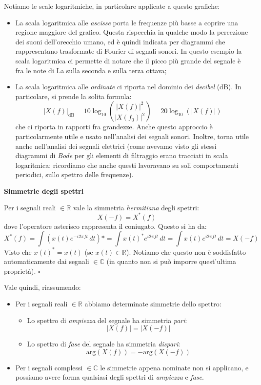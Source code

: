 \documentclass[a4paper,11pt]{article}
\begin{document}
Notiamo le scale logaritmiche, in particolare applicate a questo grafiche:
\begin{itemize}
	\item La scala logaritmica alle \textit{ascisse} porta le frequenze più basse a coprire una regione maggiore del grafico. Questa rispecchia in qualche modo la percezione dei suoni dell'orecchio umano, ed è quindi indicata per diagrammi che rappresentano trasformate di Fourier di segnali sonori. In questo esempio la scala logaritmica ci permette di notare che il picco più grande del segnale è fra le note di La sulla seconda e sulla terza ottava;
	\item La scala logaritmica alle \textit{ordinate} ci riporta nel dominio dei \textit{decibel} ($\mathrm{dB}$). In particolare, si prende la solita formula:
$$
| X(f) |_\mathrm{dB} = 10 \log_{10} \left( \frac{|X(f)|^2}{|X(f_0)|^2} \right) = 20 \log_{10} (|X(f)|) 
$$
che ci riporta in rapporti fra grandezze. Anche questo approccio è particolarmente utile e usato nell'analisi dei segnali sonori. Inoltre, torna utile anche nell'analisi dei segnali elettrici (come avevamo visto gli stessi diagrammi di \textit{Bode} per gli elementi di filtraggio erano tracciati in scala logaritmica: ricordiamo che anche questi lavoravano su soli comportamenti periodici, sullo spettro delle frequenze).
\end{itemize}

\par\smallskip

\newpage

\noindent
\textbf{\textsf{Simmetrie degli spettri}}

\noindent
Per i segnali reali $\in \mathbb{R}$ vale la simmetria \textit{hermitiana} degli spettri:
$$
X(-f) = X^*(f)
$$
dove l'operatore asterisco rappresenta il coniugato. Questo si ha da:
$$
X^*(f) = \int \left( x(t) e^{-i 2 \pi f t} \, dt \right)*
= \int x(t)^* e^{i 2 \pi f t} \, dt
= \int x(t) e^{i 2 \pi f t} \, dt = X(-f)
$$
Visto che $x(t)^* = x(t)$ (se $x(t) \in \mathbb{R}$). Notiamo che questo non è soddisfatto automaticamente dai segnali $\in \mathbb{C}$ (in quanto non si può imporre quest'ultima proprietà). \hfill $\square$

Vale quindi, riassumendo:
\begin{itemize}
	\item Per i segnali reali $\in \mathbb{R}$ abbiamo determinate  simmetrie dello spettro:
	\begin{itemize}
		\item Lo spettro di \textit{ampiezza} del segnale ha simmetria \textit{pari}:
			$$
			|X(f)| = |X(-f)|
			$$
		\item Lo spettro di \textit{fase} del segnale ha simmetria \textit{dispari}:
			$$
			\mathrm{arg}(X(f)) = -\mathrm{arg}(X(-f))
			$$
	\end{itemize}
	\item Per i segnali complessi $\in \mathbb{C}$ le simmetrie appena nominate non si applicano, e possiamo avere forma qualsiasi degli spettri di \textit{ampiezza} e \textit{fase}. 
\end{itemize}
\end{document}
